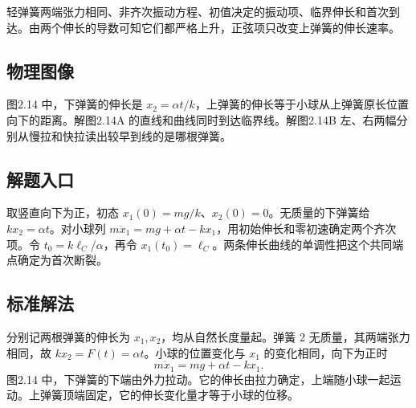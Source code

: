 \documentclass[UTF8,fontset=fandol,a4paper,11pt]{ctexart}
\begin{document}
轻弹簧两端张力相同、非齐次振动方程、初值决定的振动项、临界伸长和首次到达。由两个伸长的导数可知它们都严格上升，正弦项只改变上弹簧的伸长速率。




\subsection*{物理图像}

图2.14 中，下弹簧的伸长是 $x_2=\alpha t/k$，上弹簧的伸长等于小球从上弹簧原长位置向下的距离。解图2.14A 的直线和曲线同时到达临界线。解图2.14B 左、右两幅分别从慢拉和快拉读出较早到线的是哪根弹簧。



\subsection*{解题入口}

取竖直向下为正，初态 $x_1(0)=mg/k$、$x_2(0)=0$。无质量的下弹簧给 $kx_2=\alpha t$。对小球列 $m\ddot x_1=mg+\alpha t-kx_1$，用初始伸长和零初速确定两个齐次项。令 $t_0=k\ell_C/\alpha$，再令 $x_1(t_0)=\ell_C$。两条伸长曲线的单调性把这个共同端点确定为首次断裂。



\subsection*{标准解法}

分别记两根弹簧的伸长为 $x_1,x_2$，均从自然长度量起。弹簧 2 无质量，其两端张力相同，故 $kx_2=F(t)=\alpha t$。小球的位置变化与 $x_1$ 的变化相同，向下为正时
\[
m\ddot x_1=mg+\alpha t-kx_1.
\]
图2.14 中，下弹簧的下端由外力拉动。它的伸长由拉力确定，上端随小球一起运动。上弹簧顶端固定，它的伸长变化量才等于小球的位移。
\end{document}
